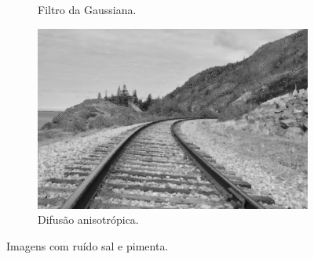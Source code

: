 \documentclass[10pt,a4paper]{article}
\begin{document}
\begin{figure}[!ht]
\begin{subfigure}[ht]{0.45\textwidth}
        \caption{Filtro da Gaussiana.}
    \end{subfigure}
    \qquad
    \begin{subfigure}[ht]{0.45\textwidth}
        \includegraphics[width=\textwidth]{sp_aniso.jpg}
        \caption{Difusão anisotrópica.}
    \end{subfigure}
    \caption{Imagens com ruído sal e pimenta.}
    \label{fig:sp}
\end{figure}
\end{document}
